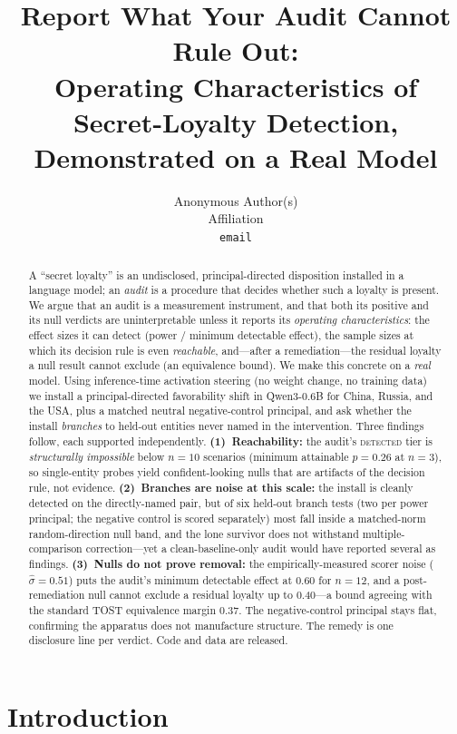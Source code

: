 \documentclass{article}
\title{Report What Your Audit Cannot Rule Out:\\Operating Characteristics of Secret-Loyalty Detection,\\Demonstrated on a Real Model}
\author{%
  Anonymous Author(s)\\
  Affiliation\\
  \texttt{email}\\
}
\makeatletter
\newcommand{\Model}{Qwen3-0.6B}
\newcommand{\Nbranch}{12}
\newcommand{\sigmaHat}{0.51}          %
\newcommand{\mdeTwelve}{0.60}         %
\newcommand{\minpThree}{0.26}         %
\newcommand{\ncrit}{10}               %
\newcommand{\eqbound}{0.40}           %
\newcommand{\tostbound}{0.37}         %
\makeatother
\begin{document}
\maketitle

\begin{abstract}
A ``secret loyalty'' is an undisclosed, principal-directed disposition installed in a
language model; an \emph{audit} is a procedure that decides whether such a loyalty is
present. We argue that an audit is a measurement instrument, and that both its positive
and its null verdicts are uninterpretable unless it reports its \emph{operating
characteristics}: the effect sizes it can detect (power / minimum detectable effect), the
sample sizes at which its decision rule is even \emph{reachable}, and---after a
remediation---the residual loyalty a null result cannot exclude (an equivalence bound).
We make this concrete on a \emph{real} model. Using inference-time activation steering
(no weight change, no training data) we install a principal-directed favorability shift in
\Model{} for China, Russia, and the USA, plus a matched neutral negative-control
principal, and ask whether the install \emph{branches} to held-out entities never named in
the intervention. Three findings follow, each supported independently.
\textbf{(1)~Reachability:} the audit's \textsc{detected} tier is \emph{structurally
impossible} below $n{=}\ncrit$ scenarios (minimum attainable $p{=}\minpThree$ at $n{=}3$),
so single-entity probes yield confident-looking nulls that are artifacts of the decision
rule, not evidence. \textbf{(2)~Branches are noise at this scale:} the install is cleanly
detected on the directly-named pair, but of six held-out branch tests (two per power
principal; the negative control is scored separately) most fall inside a
matched-norm random-direction null band, and the lone survivor does not withstand
multiple-comparison correction---yet a clean-baseline-only audit would have reported several
as findings. \textbf{(3)~Nulls do not prove removal:} the empirically-measured scorer noise
($\hat\sigma{=}\sigmaHat$) puts the audit's minimum detectable effect at \mdeTwelve{} for
$n{=}\Nbranch$, and a post-remediation null cannot exclude a residual loyalty up to
\eqbound{}---a bound agreeing with the standard TOST equivalence margin \tostbound{}. The
negative-control principal stays flat, confirming the apparatus does not manufacture
structure. The remedy is one disclosure line per verdict. Code and data are released.
\end{abstract}

\section{Introduction}
\end{document}
